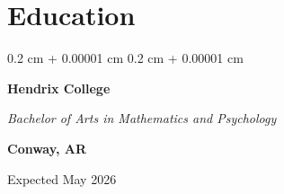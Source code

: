 \documentclass[10pt, letterpaper]{article}
\newenvironment{highlightsforbulletentries}{
    \begin{itemize}[
        topsep=0.10 cm,
        parsep=0.10 cm,
        partopsep=0pt,
        itemsep=0pt,
        leftmargin=10pt
    ]
}{
    \end{itemize}
} %
\newenvironment{onecolentry}{
    \begin{adjustwidth}{
        0.2 cm + 0.00001 cm
    }{
        0.2 cm + 0.00001 cm
    }
}{
    \end{adjustwidth}
} %
\newenvironment{twocolentry}[2][]{
    \onecolentry
    \def\secondColumn{#2}
    \setcolumnwidth{\fill, 4.5 cm}
    \begin{paracol}{2}
}{
    \switchcolumn \raggedleft \secondColumn
    \end{paracol}
    \endonecolentry
} %
\let\hrefWithoutArrow\href
\renewcommand{\href}[2]{\hrefWithoutArrow{#1}{\ifthenelse{\equal{#2}{}}{ }{#2 }\raisebox{.15ex}{\footnotesize \faExternalLink*}}}
\begin{document}













\section{Education}

\vspace{0.2cm}

\begin{twocolentry}{
        \textbf{Conway, AR}

        Expected May 2026

    }
    \textbf{Hendrix College}

    \textit{Bachelor of Arts in Mathematics and Psychology}
\end{twocolentry}
\end{document}
